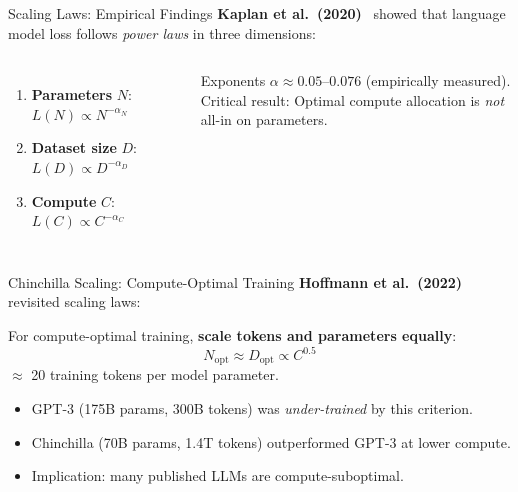 \documentclass[aspectratio=169,10pt]{beamer}
\begin{document}

\begin{frame}{Scaling Laws: Empirical Findings}
  \textbf{Kaplan et al.\ (2020)}~\cite{kaplan2020scaling} showed that language model loss follows
  \emph{power laws} in three dimensions:
  \vspace{0.4em}
  \begin{columns}[T]
      \begin{enumerate}
        \item \textbf{Parameters} $N$: $L(N) \propto N^{-\alpha_N}$
        \item \textbf{Dataset size} $D$: $L(D) \propto D^{-\alpha_D}$
        \item \textbf{Compute} $C$: $L(C) \propto C^{-\alpha_C}$
      \end{enumerate}
      \vspace{0.5em}
      Exponents $\alpha \approx 0.05$–$0.076$ (empirically measured).\\
      \vspace{0.3em}
      \alert{Critical result:} Optimal compute allocation is \emph{not} all-in on parameters.
      
  \end{columns}
\end{frame}

\begin{frame}{Chinchilla Scaling: Compute-Optimal Training}
  \textbf{Hoffmann et al.\ (2022)}~\cite{hoffmann2022chinchilla} revisited scaling laws:
  \vspace{0.4em}
  \begin{tcolorbox}[hitbox, title=Chinchilla Rule of Thumb]
    For compute-optimal training, \textbf{scale tokens and parameters equally}:
    \[
      N_\text{opt} \approx D_\text{opt} \propto C^{0.5}
    \]
    $\approx$ 20 training tokens per model parameter.
  \end{tcolorbox}
  \vspace{0.4em}
  \begin{itemize}
    \item GPT-3 (175B params, 300B tokens) was \emph{under-trained} by this criterion.
    \item Chinchilla (70B params, 1.4T tokens) outperformed GPT-3 at lower compute.
    \item Implication: many published LLMs are compute-suboptimal.
  \end{itemize}
\end{frame}
\end{document}
